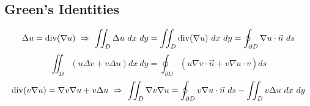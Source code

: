 \documentclass[a4paper]{article}
\begin{document}
\begin{twocolumn}
\subsection{Green's Identities}

	$$\Delta u =\divergence(\nabla u) \ \Rightarrow \ \iint_D \Delta u \ dx \ dy =\iint_D \divergence(\nabla u)\ dx \ dy = \oint_{\partial D} \nabla u \cdot \vec{n} \ ds $$
	$$\iint_D \left(u \Delta v + v \Delta u\right) dx \ dy = \oint_{\partial D} \left(u \nabla v \cdot \vec n + v \nabla u \cdot v \right) ds$$
	$$\divergence(v \nabla u) = \nabla v \nabla u + v \Delta u \ \Rightarrow \ \iint_D \nabla v \nabla u = \oint_{\partial D} v \nabla u \cdot \vec{n} \ ds - \iint_D v \Delta u \ dx \ dy$$
\end{twocolumn}
\end{document}
